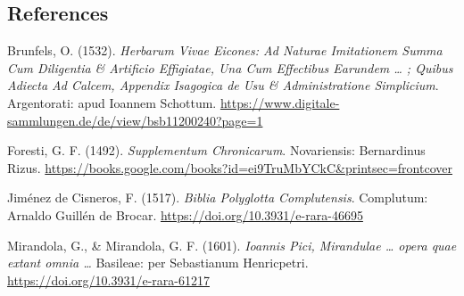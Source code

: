 \documentclass[
]{article}
\begin{document}
\hypertarget{references}{%
\subsection{References}\label{references}}

Brunfels, O. (1532). \emph{Herbarum Vivae Eicones: Ad Naturae
Imitationem Summa Cum Diligentia \& Artificio Effigiatae, Una Cum
Effectibus Earundem \ldots{} ; Quibus Adiecta Ad Calcem, Appendix
Isagogica de Usu \& Administratione Simplicium}. Argentorati: apud
Ioannem Schottum.
\url{https://www.digitale-sammlungen.de/de/view/bsb11200240?page=1}

Foresti, G. F. (1492). \emph{Supplementum Chronicarum}. Novariensis:
Bernardinus Rizus.
\url{https://books.google.com/books?id=ei9TruMbYCkC\&printsec=frontcover}

Jiménez de Cisneros, F. (1517). \emph{Biblia Polyglotta Complutensis}.
Complutum: Arnaldo Guillén de Brocar.
\url{https://doi.org/10.3931/e-rara-46695}

Mirandola, G., \& Mirandola, G. F. (1601). \emph{Ioannis Pici,
Mirandulae \ldots{} opera quae extant omnia \ldots{}} Basileae: per
Sebastianum Henricpetri. \url{https://doi.org/10.3931/e-rara-61217}
\end{document}
